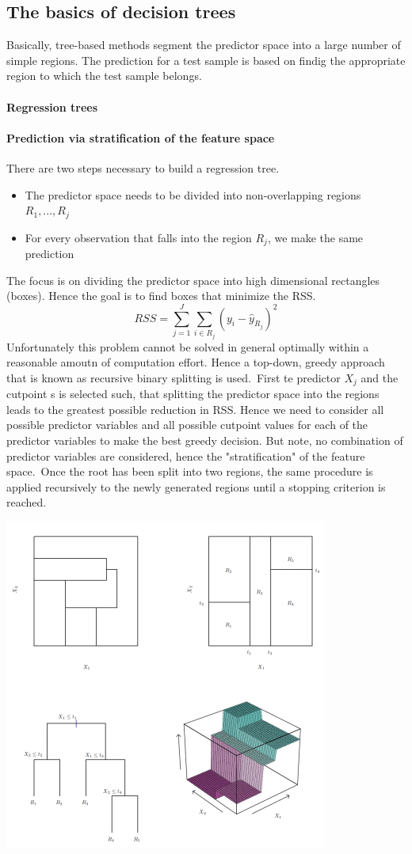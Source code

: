 \documentclass[../document.tex]{subfiles}
\begin{document}
	
	\subsection{The basics of decision trees}
	Basically, tree-based methods segment the predictor space into a large number of simple regions. The prediction for a test sample is based on findig the appropriate region to which the test sample belongs.
	\paragraph{Regression trees}
	
	\paragraph{Prediction via stratification of the feature space}
	There are two steps necessary to build a regression tree. 
	\begin{itemize}
		\item The predictor space needs to be divided into non-overlapping regions \(R_{1},...,R_{j}\)
		\item For every observation that falls into the region \(R_{j}\), we make the same prediction
	\end{itemize}
	The focus is on dividing the predictor space into high dimensional rectangles (boxes). Hence the goal is to find boxes that minimize the RSS.
	\begin{equation}
		RSS = \sum_{j=1}^{J}\sum_{i\in R_{j}}(y_{i}-\hat{y}_{R_{j}})^2
	\end{equation}
	Unfortunately this problem cannot be solved in general optimally within a reasonable amoutn of computation effort. Hence a top-down, greedy approach that is known as recursive binary splitting is used.\
	First te predictor \(X_{j}\) and the cutpoint s is selected such, that splitting the predictor space into the regions leads to the greatest possible reduction in RSS. Hence we need to consider all possible predictor variables and all possible cutpoint values for each of the predictor variables to make the best greedy decision. But note, no combination of predictor variables are considered, hence the "stratification" of the feature space.\
	Once the root has been split into two regions, the same procedure is applied recursively to the newly generated regions until a stopping criterion is reached.
	\begin{center}
		\includegraphics[width=.6\textwidth]{pictures/tree.png}
	\end{center}
\end{document}
